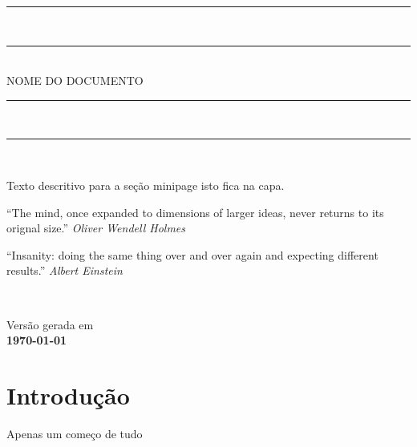 \documentclass[a4paper,12pt,openany,]{book}
\begin{document}

\thispagestyle{empty}

\begin{center}

\rule{10cm}{1.5mm}\\ \vspace{-.7\baselineskip}
\rule{10cm}{.3mm}\\ \vspace{.5\baselineskip}
{\textsc {\Huge NOME DO DOCUMENTO}}\\ \vspace{-.4\baselineskip}
\rule{10cm}{.3mm}\\ \vspace{-.5\baselineskip}
\rule{10cm}{1.5mm}\\

\vspace{5cm}
\begin{flushright}
\begin{minipage}[t]{12cm}

	{\small Texto descritivo para a seção minipage
	isto fica na capa.} \vspace{1cm}

	``The mind, once expanded to dimensions of larger ideas,
	never returns to its orignal size.'' {\em Oliver Wendell Holmes}
	\vspace{0.5\baselineskip}


    “Insanity: doing the same thing over and over again and expecting different results.”
	{\em Albert Einstein}


\end{minipage} \\
\end{flushright}

\vspace{1cm}

{\small Versão gerada em \\ \bf \today } %
\end{center}

\tableofcontents

%
\chapter{Introdução}\label{cha:intro}

Apenas um começo de tudo
\end{document}
